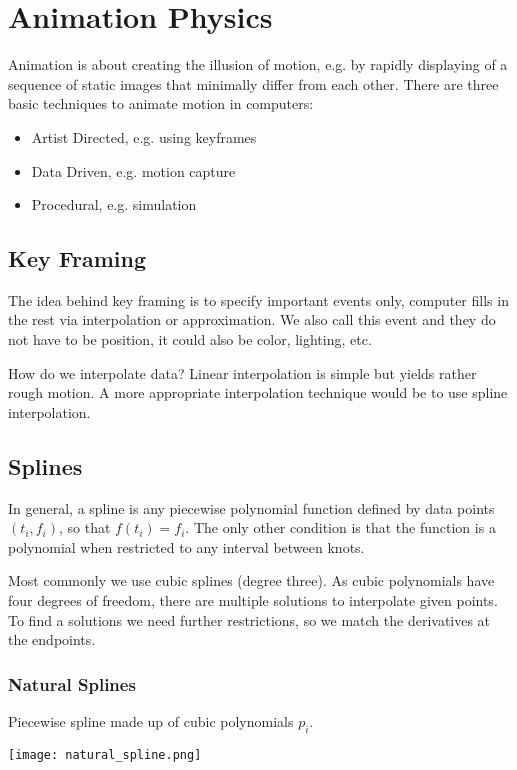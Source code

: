 \section{Animation Physics}

Animation is about creating the illusion of motion, e.g. by rapidly displaying of a sequence of static images that minimally differ from each other. There are three basic techniques to animate motion in computers:
\begin{itemize}
	\item Artist Directed, e.g. using keyframes
	\item Data Driven, e.g. motion capture
	\item Procedural, e.g. simulation
\end{itemize}


\subsection{Key Framing}

The idea behind key framing is to specify important events only, computer fills in the rest via interpolation or approximation. We also call this event and they do not have to be position, it could also be color, lighting, etc. \medskip

How do we interpolate data? Linear interpolation is simple but yields rather rough motion. A more appropriate interpolation technique would be to use spline interpolation.

\subsection{Splines}

In general, a spline is any piecewise polynomial function defined by data points $(t_i, f_i)$, so that $f(t_i) = f_i$. The only other condition is that the function is a polynomial when restricted to any interval between knots. \medskip

Most commonly we use cubic splines (degree three). As cubic polynomials have four degrees of freedom, there are multiple solutions to interpolate given points. To find a solutions we need further restrictions, so we match the derivatives at the endpoints.

\subsubsection{Natural Splines}

Piecewise spline made up of cubic polynomials $p_i$.
\begin{center}
	\texttt{[image: natural\_spline.png]}
\end{center}

